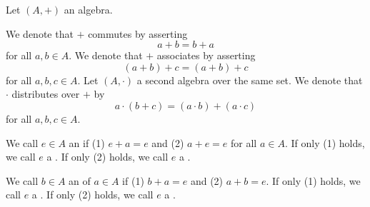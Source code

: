 Let $(A, +)$ an algebra.

We denote that $+$ commutes by asserting
$$
  a + b = b + a
$$
for all $a, b \in A$.
We denote that $+$ associates by asserting
$$
  (a + b) + c = (a + b) + c
$$
for all $a, b, c \in A$.
Let $(A, \cdot)$ a second algebra over the
same set.
We denote that $\cdot$ distributes over $+$
by
$$
  a \cdot (b + c) =
  (a \cdot b) + (a \cdot c)
$$
for all $a, b, c \in A$.


We call $e \in A$ an 
if (1) $e + a = e$ and (2) $a + e = e$ for all $a \in A$.
If only (1) holds, we call $e$ a
.
If only (2) holds, we call $e$ a
.


We call $b \in A$ an 
of $a \in A$ if (1) $b + a = e$ and (2) $a + b = e$.
If only (1) holds, we call $e$ a
.
If only (2) holds, we call $e$ a
.

\strats
